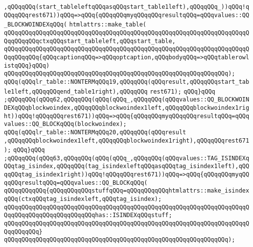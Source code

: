 \verb|,qQQqqQQq(start_tableleftqQQqasqQQqstart_table1left),qQQqqQQq_))qQQq!qQQqqQQqrest671))qQQq=>qQQq{qQQqqQQqmyqQQqqQQqresultqQQq=qQQqvalues::QQ_BLOCKWOINDEXqQQq(|\newline
\verb|htmlattrs::make_table(|\newline
\verb|qQQqqQQqqQQqqQQqqQQqqQQqqQQqqQQqqQQqqQQqqQQqqQQqqQQqqQQqqQQqqQQqqQQqqQQqqQQqqQQqctxqQQqstart_tableleft,qQQqstart_table,|\newline
\verb|qQQqqQQqqQQqqQQqqQQqqQQqqQQqqQQqqQQqqQQqqQQqqQQqqQQqqQQqqQQqqQQqqQQqqQQqqQQqqQQq{qQQqcaptionqQQq=>qQQqoptcaption,qQQqbodyqQQq=>qQQqtablerowlistqQQq}qQQq)|\newline
\verb|qQQqqQQqqQQqqQQqqQQqqQQqqQQqqQQqqQQqqQQqqQQqqQQqqQQqqQQqqQQqqQQq);|\newline
\verb|qQQq(qQQqlr_table::NONTERMqQQq19,qQQqqQQq(qQQqresult,qQQqqQQqstart_table1left,qQQqqQQqend_table1right),qQQqqQQq|\newline
\verb|rest671);|\newline
\verb|qQQq}qQQq|\newline
\verb|;qQQqqQQq(qQQq62,qQQqqQQq(qQQq(qQQq_,qQQqqQQq(qQQqvalues::QQ_BLOCKWOINDEXqQQqblockwoindex,qQQqqQQqblockwoindex1left,qQQqqQQqblockwoindex1right))qQQq!qQQqqQQqrest671))qQQq=>qQQq{qQQqqQQqmyqQQqqQQqresultqQQq=qQQqvalues::QQ_BLOCKqQQq(blockwoindex);|\newline
\verb|qQQq(qQQqlr_table::NONTERMqQQq20,qQQqqQQq(qQQqresult|\newline
\verb|,qQQqqQQqblockwoindex1left,qQQqqQQqblockwoindex1right),qQQqqQQqrest671);|\newline
\verb|qQQq}qQQq|\newline
\verb|;qQQqqQQq(qQQq63,qQQqqQQq(qQQq(qQQq_,qQQqqQQq(qQQqvalues::TAG_ISINDEXqQQqtag_isindex,qQQqqQQq(tag_isindexleftqQQqasqQQqtag_isindex1left),qQQqqQQqtag_isindex1right))qQQq!qQQqqQQqrest671))qQQq=>qQQq{qQQqqQQqmyqQQqqQQqresultqQQq=qQQqvalues::QQ_BLOCKqQQq(|\newline
\verb|qQQqqQQqqQQq{qQQqqQQqqQQqstuffqQQq=qQQqqQQqqQQqhtmlattrs::make_isindexqQQq(ctxqQQqtag_isindexleft,qQQqtag_isindex);|\newline
\verb|qQQqqQQqqQQqqQQqqQQqqQQqqQQqqQQqqQQqqQQqqQQqqQQqqQQqqQQqqQQqqQQqqQQqqQQqqQQqqQQqqQQqqQQqqQQqqQQqhas::ISINDEXqQQqstuff;|\newline
\verb|qQQqqQQqqQQqqQQqqQQqqQQqqQQqqQQqqQQqqQQqqQQqqQQqqQQqqQQqqQQqqQQqqQQqqQQqqQQqqQQq}|\newline
\verb|qQQqqQQqqQQqqQQqqQQqqQQqqQQqqQQqqQQqqQQqqQQqqQQqqQQqqQQqqQQqqQQq);|\newline
